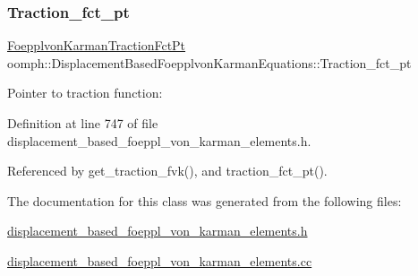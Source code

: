 \mbox{\label{classoomph_1_1DisplacementBasedFoepplvonKarmanEquations_ae89a72c87d03fe0fceee1a42bcd3fcb8}} 
\subsubsection{\texorpdfstring{Traction\+\_\+fct\+\_\+pt}{Traction\_fct\_pt}}
{\footnotesize\ttfamily \hyperlink{classoomph_1_1DisplacementBasedFoepplvonKarmanEquations_ab2c41b3ecc15b89802657c068ee3e1cc}{Foepplvon\+Karman\+Traction\+Fct\+Pt} oomph\+::\+Displacement\+Based\+Foepplvon\+Karman\+Equations\+::\+Traction\+\_\+fct\+\_\+pt\hspace{0.3cm}{\ttfamily [protected]}}



Pointer to traction function\+: 



Definition at line 747 of file displacement\+\_\+based\+\_\+foeppl\+\_\+von\+\_\+karman\+\_\+elements.\+h.



Referenced by get\+\_\+traction\+\_\+fvk(), and traction\+\_\+fct\+\_\+pt().



The documentation for this class was generated from the following files\+:\begin{DoxyCompactItemize}
\item 
\hyperlink{displacement__based__foeppl__von__karman__elements_8h}{displacement\+\_\+based\+\_\+foeppl\+\_\+von\+\_\+karman\+\_\+elements.\+h}\item 
\hyperlink{displacement__based__foeppl__von__karman__elements_8cc}{displacement\+\_\+based\+\_\+foeppl\+\_\+von\+\_\+karman\+\_\+elements.\+cc}\end{DoxyCompactItemize}
